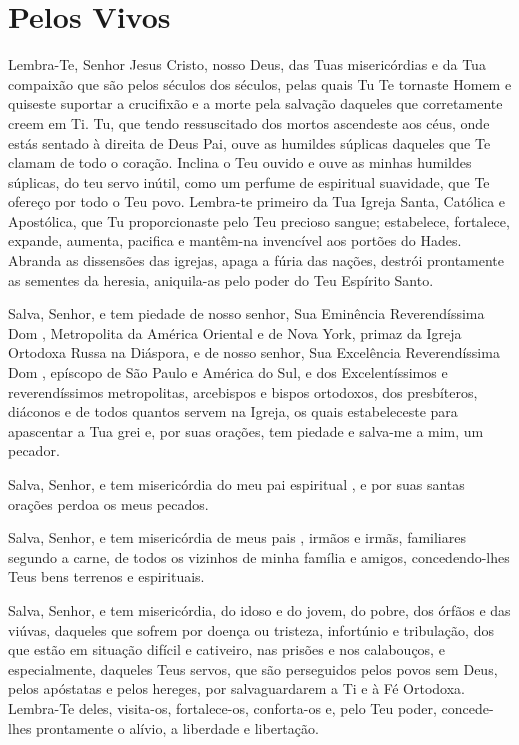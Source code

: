 \documentclass{subfiles}
\begin{document}

\section*{Pelos Vivos}

Lembra-Te, Senhor Jesus Cristo, nosso Deus, das Tuas misericórdias e da Tua
compaixão que são pelos séculos dos séculos, pelas quais Tu Te tornaste Homem e
quiseste suportar a crucifixão e a morte pela salvação daqueles que corretamente
creem em Ti. Tu, que tendo ressuscitado dos mortos ascendeste aos céus, onde
estás sentado à direita de Deus Pai, ouve as humildes súplicas daqueles que Te
clamam de todo o coração. Inclina o Teu ouvido e ouve as minhas humildes
súplicas, do teu servo inútil, como um perfume de espiritual suavidade, que Te
ofereço por todo o Teu povo. Lembra-te primeiro da Tua Igreja Santa, Católica e
Apostólica, que Tu proporcionaste pelo Teu precioso sangue; estabelece,
fortalece, expande, aumenta, pacifica e mantêm-na invencível aos portões do
Hades. Abranda as dissensões das igrejas, apaga a fúria das nações, destrói
prontamente as sementes da heresia, aniquila-as pelo poder do Teu Espírito
Santo. \metanoia{}

Salva, Senhor, e tem piedade de nosso senhor, Sua Eminência Reverendíssima Dom
\dotextit{[nome]}, Metropolita da América Oriental e de Nova York, primaz da
Igreja Ortodoxa Russa na Diáspora, e de nosso senhor, Sua Excelência
Reverendíssima Dom \dotextit{[nome]}, epíscopo de São Paulo e América do Sul, e
dos Excelentíssimos e reverendíssimos metropolitas, arcebispos e bispos
ortodoxos, dos presbíteros, diáconos e de todos quantos servem na Igreja, os
quais estabeleceste para apascentar a Tua grei e, por suas orações, tem piedade
e salva-me a mim, um pecador. \metanoia{}

Salva, Senhor, e tem misericórdia do meu pai espiritual \dotextit{[nome]}, e por
suas santas orações perdoa os meus pecados. \metanoia{}

Salva, Senhor, e tem misericórdia de meus pais \dotextit{[nomes]}, irmãos e
irmãs, familiares segundo a carne, de todos os vizinhos de minha família e
amigos, concedendo-lhes Teus bens terrenos e espirituais. \metanoia{}

Salva, Senhor, e tem misericórdia, do idoso e do jovem, do pobre, dos órfãos e
das viúvas, daqueles que sofrem por doença ou tristeza, infortúnio e tribulação,
dos que estão em situação difícil e cativeiro, nas prisões e nos calabouços, e
especialmente, daqueles Teus servos, que são perseguidos pelos povos sem Deus,
pelos apóstatas e pelos hereges, por salvaguardarem a Ti e à Fé Ortodoxa.
Lembra-Te deles, visita-os, fortalece-os, conforta-os e, pelo Teu poder,
concede-lhes prontamente o alívio, a liberdade e libertação. \metanoia{}
\end{document}
